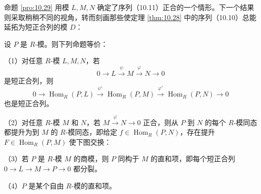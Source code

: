 命题 \ref{pro:10.29} 用模 \(L, M, N\) 确定了序列（10.11）正合的一个情形。下一个结果则采取稍稍不同的视角，转而刻画那些使定理 \ref{thm:10.28} 中的序列（10.10）总能延拓为短正合列的模 \(D\)：

\begin{proposition}\label{pro:10.30}
设 \(P\) 是 \(R\)-模。则下列命题等价：

（1）对任意 \(R\)-模 \(L, M, N\)，若
\[
0 \longrightarrow L \xrightarrow{\ \psi\ } M \xrightarrow{\ \varphi\ } N \longrightarrow 0
\]
是短正合列，则
\[
0 \longrightarrow \operatorname{Hom}_R(P, L) \xrightarrow{\ \psi'\ } \operatorname{Hom}_R(P, M) \xrightarrow{\ \varphi'\ } \operatorname{Hom}_R(P, N) \longrightarrow 0
\]
也是短正合列。

（2）对任意 \(R\)-模 \(M\) 和 \(N\)，若 \(M \xrightarrow{\varphi} N \to 0\) 正合，则从 \(P\) 到 \(N\) 的每个 \(R\)-模同态都提升为到 \(M\) 的 \(R\)-模同态，即给定 \(f \in \operatorname{Hom}_R(P, N)\)，存在提升 \(F \in \operatorname{Hom}_R(P, M)\) 使下图交换：
\begin{center}\end{center}

（3）若 \(P\) 是 \(R\)-模 \(M\) 的商模，则 \(P\) 同构于 \(M\) 的直和项，即每个短正合列 \(0 \to L \to M \to P \to 0\) 都分裂。

（4）\(P\) 是某个自由 \(R\)-模的直和项。
\end{proposition}

